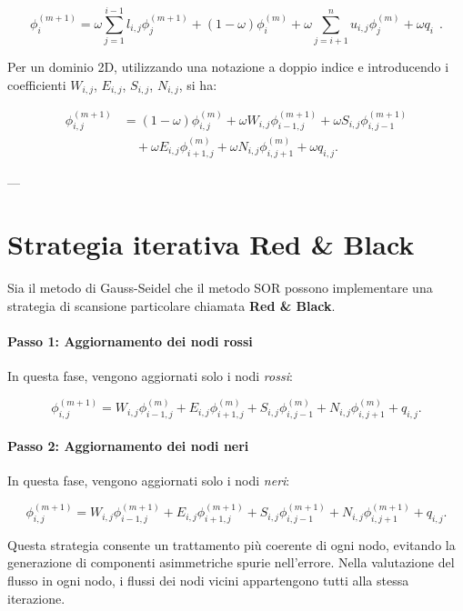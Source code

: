 \[
\phi_i^{(m+1)} = \omega \sum_{j=1}^{i-1} l_{i,j} \phi_j^{(m+1)} + (1 - \omega) \phi_i^{(m)} + \omega \sum_{j=i+1}^n u_{i,j} \phi_j^{(m)} + \omega q_i\ \ . 
\]

Per un dominio 2D, utilizzando una notazione a doppio indice e introducendo i coefficienti \(W_{i,j}\), \(E_{i,j}\), \(S_{i,j}\), \(N_{i,j}\), si ha:

\[
\begin{aligned}
	\phi_{i,j}^{(m+1)} &= (1 - \omega) \phi_{i,j}^{(m)} + \omega W_{i,j} \phi_{i-1,j}^{(m+1)} + \omega S_{i,j} \phi_{i,j-1}^{(m+1)} \\
	&\quad + \omega E_{i,j} \phi_{i+1,j}^{(m)} + \omega N_{i,j} \phi_{i,j+1}^{(m)} + \omega q_{i,j}. 
\end{aligned}
\]

---

\section{Strategia iterativa Red \& Black}

Sia il metodo di Gauss-Seidel che il metodo SOR possono implementare una strategia di scansione particolare chiamata \textbf{Red \& Black}.

\paragraph{Passo 1: Aggiornamento dei nodi rossi}

In questa fase, vengono aggiornati solo i nodi \textit{rossi}:

\[
\phi_{i,j}^{(m+1)} = W_{i,j} \phi_{i-1,j}^{(m)} + E_{i,j} \phi_{i+1,j}^{(m)} + S_{i,j} \phi_{i,j-1}^{(m)} + N_{i,j} \phi_{i,j+1}^{(m)} + q_{i,j}. 
\]

\paragraph{Passo 2: Aggiornamento dei nodi neri}

In questa fase, vengono aggiornati solo i nodi \textit{neri}:

\[
\phi_{i,j}^{(m+1)} = W_{i,j} \phi_{i-1,j}^{(m+1)} + E_{i,j} \phi_{i+1,j}^{(m+1)} + S_{i,j} \phi_{i,j-1}^{(m+1)} + N_{i,j} \phi_{i,j+1}^{(m+1)} + q_{i,j}. 
\]

Questa strategia consente un trattamento più coerente di ogni nodo, evitando la generazione di componenti asimmetriche spurie nell'errore. Nella valutazione del flusso in ogni nodo, i flussi dei nodi vicini appartengono tutti alla stessa iterazione.

